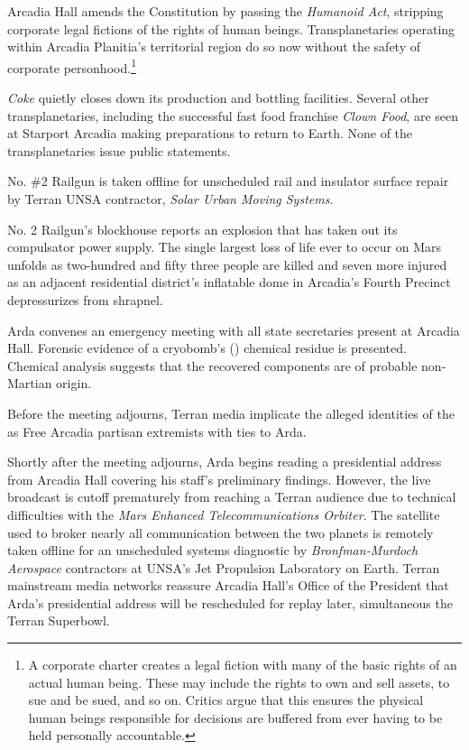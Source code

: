 Arcadia Hall amends the Constitution by passing the {\it Humanoid Act}, stripping corporate legal fictions of the rights of human beings. Transplanetaries operating within Arcadia Planitia's territorial region do so now without the safety of corporate personhood.\footnote{A corporate charter creates a legal fiction with many of the basic rights of an actual human being. These may include the rights to own and sell assets, to sue and be sued, and so on. Critics argue that this ensures the physical human beings responsible for decisions are buffered from ever having to be held personally accountable.}
\StopTimelineDate

{\it Coke} quietly closes down its production and bottling facilities. Several other transplanetaries, including the successful fast food franchise {\it Clown Food}, are seen at Starport Arcadia making preparations to return to Earth. None of the transplanetaries issue public statements.
\StopTimelineDate

No. \#2 Railgun is taken offline for unscheduled rail and insulator surface repair by Terran UNSA contractor, {\it Solar Urban Moving Systems}.
\StopTimelineDate

No. \type{#}2 Railgun's blockhouse reports an explosion that has taken out its compulsator power supply. The single largest loss of life ever to occur on Mars unfolds as two-hundred and fifty three people are killed and seven more injured as an adjacent residential district's inflatable dome in Arcadia's Fourth Precinct depressurizes from shrapnel.

Arda convenes an emergency meeting with all state secretaries present at Arcadia Hall. Forensic evidence of a cryobomb's () chemical residue is presented. Chemical analysis suggests that the recovered components are of probable non-Martian origin. 

Before the meeting adjourns, Terran media implicate the alleged identities of the  as Free Arcadia partisan extremists with ties to Arda.

Shortly after the meeting adjourns, Arda begins reading a presidential address from Arcadia Hall covering his staff's preliminary findings. However, the live broadcast is cutoff prematurely from reaching a Terran audience due to technical difficulties with the {\it Mars Enhanced Telecommunications Orbiter}. The satellite used to broker nearly all communication between the two planets is remotely taken offline for an unscheduled systems diagnostic by {\it Bronfman-Murdoch Aerospace} contractors at UNSA's Jet Propulsion Laboratory on Earth. Terran mainstream media networks reassure Arcadia Hall's Office of the President that Arda's presidential address will be rescheduled for replay later, simultaneous the Terran Superbowl.

